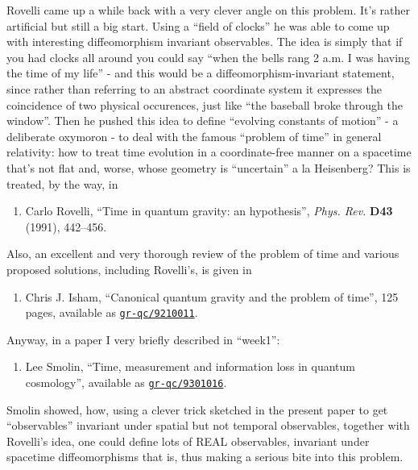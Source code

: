 \documentclass{article}
\def\tightlist{}
\begin{document}
Rovelli came up a while back with a very clever angle on this problem.
It's rather artificial but still a big start. Using a ``field of
clocks'' he was able to come up with interesting diffeomorphism
invariant observables. The idea is simply that if you had clocks all
around you could say ``when the bells rang 2 a.m. I was having the time
of my life'' - and this would be a diffeomorphism-invariant statement,
since rather than referring to an abstract coordinate system it
expresses the coincidence of two physical occurences, just like ``the
baseball broke through the window''. Then he pushed this idea to define
``evolving constants of motion'' - a deliberate oxymoron - to deal with
the famous ``problem of time'' in general relativity: how to treat time
evolution in a coordinate-free manner on a spacetime that's not flat
and, worse, whose geometry is ``uncertain'' a la Heisenberg? This is
treated, by the way, in

\begin{enumerate}
\def\labelenumi{\arabic{enumi})}
\setcounter{enumi}{2}
\tightlist
\item
  Carlo Rovelli, ``Time in quantum gravity: an hypothesis'', \emph{Phys.
  Rev.} \textbf{D43} (1991), 442--456.
\end{enumerate}

Also, an excellent and very thorough review of the problem of time and
various proposed solutions, including Rovelli's, is given in

\begin{enumerate}
\def\labelenumi{\arabic{enumi})}
\setcounter{enumi}{3}
\tightlist
\item
  Chris J. Isham, ``Canonical quantum gravity and the problem of time'',
  125 pages, available as
  \href{http://xxx.lanl.gov/abs/gr-qc/9210011}{\texttt{gr-qc/9210011}}.
\end{enumerate}

Anyway, in a paper I very briefly described in ``week1'':

\begin{enumerate}
\def\labelenumi{\arabic{enumi})}
\setcounter{enumi}{4}
\tightlist
\item
  Lee Smolin, ``Time, measurement and information loss in quantum
  cosmology'', available as
  \href{http://xxx.lanl.gov/abs/gr-qc/9301016}{\texttt{gr-qc/9301016}}.
\end{enumerate}

Smolin showed, how, using a clever trick sketched in the present paper
to get ``observables'' invariant under spatial but not temporal
observables, together with Rovelli's idea, one could define lots of REAL
observables, invariant under spacetime diffeomorphisms that is, thus
making a serious bite into this problem.
\end{document}
